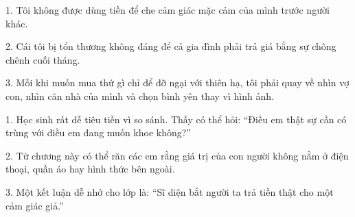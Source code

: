\begin{turanminh}
1. Tôi không được dùng tiền để che cảm giác mặc cảm của mình trước người khác.

2. Cái tôi bị tổn thương không đáng để cả gia đình phải trả giá bằng sự chông chênh cuối tháng.

3. Mỗi khi muốn mua thứ gì chỉ để đỡ ngại với thiên hạ, tôi phải quay về nhìn vợ con, nhìn căn nhà của mình và chọn bình yên thay vì hình ảnh.
\end{turanminh}

\begin{dayhoc}
1. Học sinh rất dễ tiêu tiền vì so sánh. Thầy có thể hỏi: ``Điều em thật sự cần có trùng với điều em đang muốn khoe không?''

2. Từ chương này có thể răn các em rằng giá trị của con người không nằm ở điện thoại, quần áo hay hình thức bên ngoài.

3. Một kết luận dễ nhớ cho lớp là: ``Sĩ diện bắt người ta trả tiền thật cho một cảm giác giả.''
\end{dayhoc}